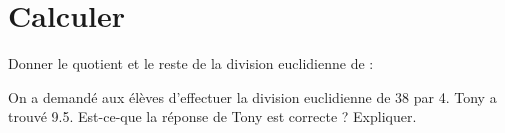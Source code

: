 \section{Calculer}

\begin{questions}
	\question Donner le quotient et le reste de la division euclidienne de :
	

	\question 

	\question On a demandé aux élèves d'effectuer la division euclidienne de 38 par 4. Tony a trouvé \num{9.5}. Est-ce-que la réponse de Tony est correcte ? Expliquer.
	
	
%		
%		
	
\end{questions}